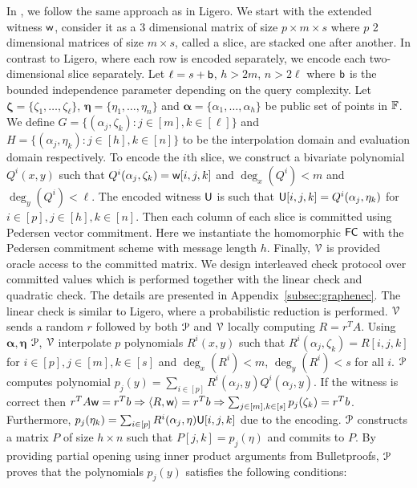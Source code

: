 In \name, we follow the same approach as in Ligero. We start with the extended witness $\mathsf{w}$, consider it as a 3 dimensional matrix of size $p \times m \times s$ where $p$ 2 dimensional matrices of size $m \times s$, called a slice, are stacked one after another. In contrast to Ligero, where each row is encoded separately, we encode each two-dimensional slice separately. Let $\ell = s + \mathsf{b}$, $h > 2m$, $n > 2\ell$ where $\mathsf{b}$ is the bounded independence parameter depending on the query complexity. Let ${\bm \zeta} = \{ \zeta_1, \ldots, \zeta_{\ell}\}$, ${\bm \eta} = \{\eta_1, \ldots, \eta_{n}\}$ and ${\bm \alpha} = \{ \alpha_1, \ldots, \alpha_h \}$ be public set of points in $\mathbb{F}$. We define $G = \{(\alpha_j,\zeta_k) : j \in [m],k \in [\ell] \}$ and $H = \{(\alpha_j,\eta_k) : j \in [h],k \in [n] \}$ to be the interpolation domain and evaluation domain respectively. To encode the $i$th slice, we construct a bivariate polynomial $Q^i(x,y)$ such that $Q^i(\alpha_j,\zeta_k) = \mathsf{w}[i,j,k]$ and $\deg_x(Q^i) < m$ and $\deg_y(Q^i) < \ell$.
The encoded witness $\mathsf{U}$ is such that $\mathsf{U}[i,j,k] = Q^i(\alpha_j,\eta_k)$ for $i\in[p], j\in[h], k\in[n]$. Then each column of each slice is committed using Pedersen vector commitment. Here we instantiate the homomorphic $\mathsf{FC}$ with the Pedersen commitment scheme with message length $h$. Finally, $\mathcal{V}$ is provided oracle access to the committed matrix.
We design interleaved check protocol over committed values which is performed together with the linear check and quadratic check. The details are presented in Appendix~\ref{subsec:graphenec}. 
The linear check is similar to Ligero, where a probabilistic reduction is performed. $\mathcal{V}$ sends a random $r$ followed by both $\mathcal{P}$ and $\mathcal{V}$ locally computing $R = r^TA$. Using ${\bm \alpha, \bm \eta}$ $\mathcal{P}$, $\mathcal{V}$ interpolate $p$ polynomials $R^i(x,y)$ such that $R^i(\alpha_j, \zeta_k) = R[i,j,k]$ for $i\in[p], j\in[m], k\in[s]$ and $\deg_x(R^i) < m$, $\deg_y(R^i) < s$ for all $i$. $\mathcal{P}$ computes polynomial $p_j(y) = \sum_{i\in[p]} R^i(\alpha_j, y) Q^i(\alpha_j, y)$. If the witness is correct then $r^TA\mathsf{w} = r^Tb \Rightarrow \langle R,\mathsf{w}\rangle = r^T b \Rightarrow \sum_{j\in [m], k\in [s]} p_j (\zeta_k) = r^Tb$. Furthermore, $p_j(\eta_k) = \sum_{i\in[p]} R^i(\alpha_j, \eta) \mathsf{U}[i,j,k]$ due to the encoding. $\mathcal{P}$ constructs a matrix $P$ of size $h \times n$ such that $P[j,k] = p_j(\eta)$ and commits to $P$. By providing partial opening using inner product arguments from Bulletproofs, $\mathcal{P}$ proves that the polynomials $p_j(y)$ satisfies the following conditions:
